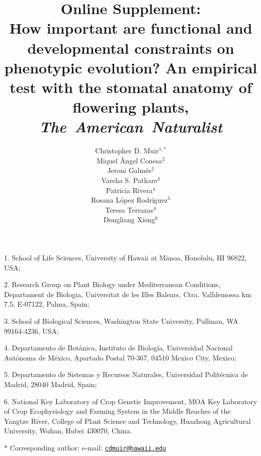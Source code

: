 \documentclass[
  12pt,
]{article}
\title{Online Supplement: \\ 
How important are functional and developmental constraints on phenotypic evolution? An empirical test with the stomatal anatomy of flowering plants, \\ 
\textit{The~American~Naturalist} }
\author{Christopher D. Muir$^{1,\ast}$ \\ 
Miquel \`{A}ngel Conesa$^{2}$ \\ 
Jeroni Galm\'{e}s$^{2}$ \\
Varsha S. Pathare$^{3}$ \\
Patricia Rivera$^{4}$ \\
Rosana López Rodríguez$^{5}$ \\
Teresa Terrazas$^{4}$ \\
Dongliang Xiong$^{6}$ 
}
\date{}
\begin{document}
\maketitle

\noindent{} 1. School of Life Sciences, University of Hawaii at Mānoa, Honolulu, HI 96822, USA;

\noindent{} 2. Research Group on Plant Biology under Mediterranean Conditions, Departament de Biologia, Universitat de les Illes Balears, Ctra. Valldemossa km 7.5, E-07122, Palma, Spain;

\noindent{} 3. School of Biological Sciences, Washington State University, Pullman, WA 99164-4236, USA;

\noindent{} 4. Departamento de Botánica, Instituto de Biología, Universidad Nacional Autónoma de México, Apartado Postal 70‑367, 04510 Mexico City, Mexico;

\noindent{} 5. Departamento de Sistemas y Recursos Naturales, Universidad Politécnica de Madrid, 28040 Madrid, Spain;

\noindent{} 6. National Key Laboratory of Crop Genetic Improvement, MOA Key Laboratory of Crop Ecophysiology and Farming System in the Middle Reaches of the Yangtze River, College of Plant Science and Technology, Huazhong Agricultural University, Wuhan, Hubei 430070, China.

\noindent{} \(\ast\) Corresponding author; e-mail: \href{mailto:cdmuir@hawaii.edu}{\nolinkurl{cdmuir@hawaii.edu}}

\begin{table}
  \captionsetup{labelformat=empty}
  \caption{}
  \label{tab:traits}
\end{table}

\begin{figure}[ht]
  \captionsetup{labelformat=empty}
  \caption{}
  \label{fig:concepts}
\end{figure}

\begin{figure}[ht]
  \captionsetup{labelformat=empty}
  \caption{}
  \label{fig:h3}
\end{figure}

\begin{figure}[ht]
  \captionsetup{labelformat=empty}
  \caption{}
  \label{fig:h1_raw}
\end{figure}

\begin{figure}[ht]
  \captionsetup{labelformat=empty}
  \caption{}
  \label{fig:h1}
\end{figure}
\end{document}
